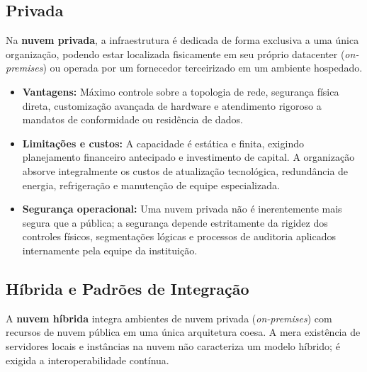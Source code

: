 \documentclass[11pt,a4paper]{article}
\begin{document}
\subsection{Privada}

Na \textbf{nuvem privada}, a infraestrutura é dedicada de forma exclusiva a uma única organização, podendo estar localizada fisicamente em seu próprio datacenter (\emph{on-premises}) ou operada por um fornecedor terceirizado em um ambiente hospedado.

\begin{itemize}[leftmargin=*]
    \item \textbf{Vantagens:} Máximo controle sobre a topologia de rede, segurança física direta, customização avançada de hardware e atendimento rigoroso a mandatos de conformidade ou residência de dados.
    \item \textbf{Limitações e custos:} A capacidade é estática e finita, exigindo planejamento financeiro antecipado e investimento de capital. A organização absorve integralmente os custos de atualização tecnológica, redundância de energia, refrigeração e manutenção de equipe especializada.
    \item \textbf{Segurança operacional:} Uma nuvem privada não é inerentemente mais segura que a pública; a segurança depende estritamente da rigidez dos controles físicos, segmentações lógicas e processos de auditoria aplicados internamente pela equipe da instituição.
\end{itemize}

\subsection{Híbrida e Padrões de Integração}

A \textbf{nuvem híbrida} integra ambientes de nuvem privada (\emph{on-premises}) com recursos de nuvem pública em uma única arquitetura coesa. A mera existência de servidores locais e instâncias na nuvem não caracteriza um modelo híbrido; é exigida a interoperabilidade contínua.
\end{document}
